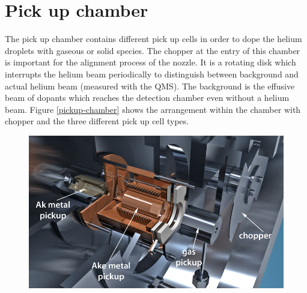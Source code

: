\documentclass[parskip,12pt,headsepline,a4paper] {scrbook}
\begin{document}
\section{Pick up chamber}
\vspace{-1\baselineskip}
The pick up chamber contains different pick up cells in order to dope the helium droplets with gaseous or solid species. The chopper at the entry of this chamber is important for the alignment process of the nozzle. It is a rotating disk which interrupts the helium beam periodically to distinguish between background and actual helium beam (measured with the QMS). The background is the effusive beam of dopants which reaches the detection chamber even without a helium beam. %
Figure \ref{pickup-chamber} shows the arrangement within the chamber with chopper and the three different pick up cell types.

\begin{figure}[ht]
\centerline{
\includegraphics[width=13cm]{./experimental_setup/pickup-chamber.jpg}}
\end{figure}
\end{document}
